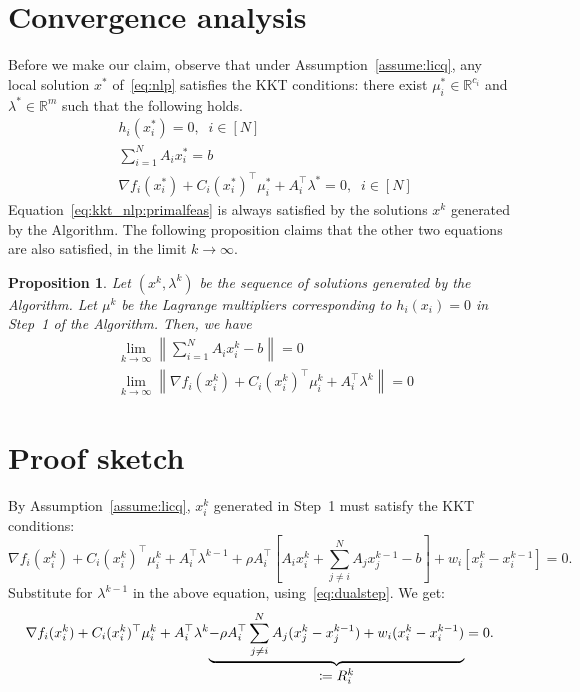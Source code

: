 \documentclass[11pt]{article}
\newtheorem{prop}{Proposition}
\newcommand{\norm}[1]{\left\lVert #1 \right\rVert}
\begin{document}
\section{Convergence analysis}
Before we make our claim, observe that under Assumption~\ref{assume:licq}, any local solution $x^*$ of~\eqref{eq:nlp} satisfies the KKT conditions: there exist $\mu_i^* \in \mathbb{R}^{c_i}$ and $\lambda^* \in \mathbb{R}^m$ such that the following holds.
\begin{subequations}\label{eq:kkt_nlp}
\begin{align}
& h_i(x_i^*) = 0, \;\; i \in [N] \label{eq:kkt_nlp:primalfeas}\\
& \sum_{i = 1}^N A_i x_i^* = b \label{eq:kkt_nlp:coupling}\\
& \nabla f_i(x_i^*) + C_i(x_i^*)^\top \mu_i^* + A_i^\top \lambda^* = 0, \;\; i \in [N]\label{eq:kkt_nlp:dualfeas}
\end{align}
\end{subequations}
Equation~\eqref{eq:kkt_nlp:primalfeas} is always satisfied by the solutions $x^k$ generated by the Algorithm. The following proposition claims that the other two equations are also satisfied, in the limit $k \to \infty$.

\begin{prop}
    Let $(x^k, \lambda^k)$ be the sequence of solutions generated by the Algorithm. Let $\mu^k$ be the Lagrange multipliers corresponding to $h_i(x_i) = 0$ in Step~1 of the Algorithm. Then, we have
    \begin{subequations}\label{eq:kkt_lim}
        \begin{align}
        & \lim_{k \to \infty} \norm{\sum_{i = 1}^N A_i x_i^k - b} = 0 \label{eq:kkt_lim:coupling}\\
        & \lim_{k \to \infty} \norm{\nabla f_i(x_i^k) + C_i(x_i^k)^\top \mu_i^k + A_i^\top \lambda^k} = 0\label{eq:kkt_lim:dualfeas}
        \end{align}
    \end{subequations}
\end{prop}


\section{Proof sketch}
By Assumption~\eqref{assume:licq}, $x_i^k$ generated in Step~1 must satisfy the KKT conditions:
\begin{equation*}
\nabla f_i(x_i^k) + C_i(x_i^k)^\top \mu_i^k + A_i^\top \lambda^{k - 1} + \rho A_i^\top \left[ A_ix_i^k + \sum_{j \neq i}^N A_j x_j^{k-1} - b\right] + w_i [x_i^k - x_i^{k-1}] = 0.
\end{equation*}
Substitute for $\lambda^{k-1}$ in the above equation, using~\eqref{eq:dualstep}. We get:
\begin{equation}\label{eq:kkt_primalstep}
\nabla f_i(x_i^k) + C_i(x_i^k)^\top \mu_i^k + A_i^\top \lambda^k \underset{\text{\normalsize $\coloneqq R_i^k$}}{\underbrace{- \rho A_i^\top \sum_{j \neq i}^N A_j (x_j^k - x_j^{k - 1}) + w_i(x_i^k - x_i^{k-1})}} = 0.
\end{equation}
\end{document}
